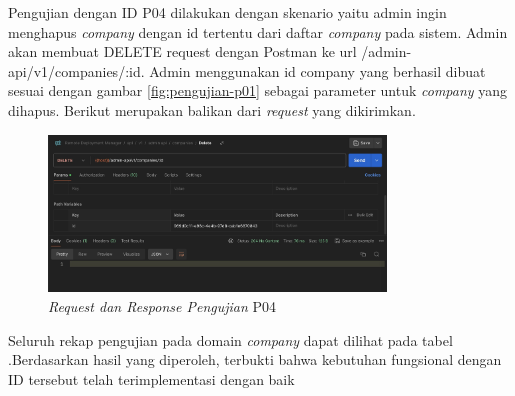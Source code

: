 Pengujian dengan ID P04 dilakukan dengan skenario yaitu admin ingin menghapus \textit{company} dengan id tertentu dari daftar \textit{company} pada sistem. Admin akan membuat DELETE request dengan Postman ke url /admin-api/v1/companies/:id. Admin menggunakan id company yang berhasil dibuat sesuai dengan gambar \ref{fig:pengujian-p01} sebagai parameter untuk \textit{company} yang dihapus. Berikut merupakan balikan dari \textit{request} yang dikirimkan.

\begin{figure}[ht]
  \centering
  \includegraphics[width=0.8\textwidth]{resources/chapter-4/pengujian/p04.jpg}
  \caption{\textit{Request dan Response Pengujian} P04}
  \label{fig:pengujian-p04}
\end{figure}

Seluruh rekap pengujian pada domain \textit{company} dapat dilihat pada tabel .Berdasarkan hasil yang diperoleh, terbukti bahwa kebutuhan fungsional dengan ID tersebut telah terimplementasi dengan baik


